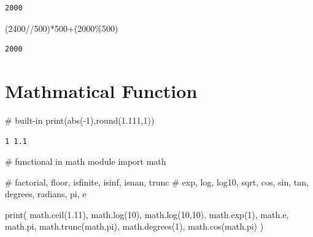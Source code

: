 \documentclass[
  a4paper,
  DIV=11,
  numbers=noendperiod]{scrreprt}
\newenvironment{Shaded}{\begin{snugshade}}{\end{snugshade}}
\newcommand{\BuiltInTok}[1]{\textcolor[rgb]{0.00,0.23,0.31}{#1}}
\newcommand{\CommentTok}[1]{\textcolor[rgb]{0.37,0.37,0.37}{#1}}
\newcommand{\DecValTok}[1]{\textcolor[rgb]{0.68,0.00,0.00}{#1}}
\newcommand{\FloatTok}[1]{\textcolor[rgb]{0.68,0.00,0.00}{#1}}
\newcommand{\ImportTok}[1]{\textcolor[rgb]{0.00,0.46,0.62}{#1}}
\newcommand{\NormalTok}[1]{\textcolor[rgb]{0.00,0.23,0.31}{#1}}
\newcommand{\OperatorTok}[1]{\textcolor[rgb]{0.37,0.37,0.37}{#1}}
\begin{document}
\begin{verbatim}
2000
\end{verbatim}

\begin{Shaded}
\begin{Highlighting}[]
\NormalTok{(}\DecValTok{2400}\OperatorTok{//}\DecValTok{500}\NormalTok{)}\OperatorTok{*}\DecValTok{500}\OperatorTok{+}\NormalTok{(}\DecValTok{2000}\OperatorTok{\%}\DecValTok{500}\NormalTok{)}
\end{Highlighting}
\end{Shaded}

\begin{verbatim}
2000
\end{verbatim}

\section{Mathmatical Function}\label{mathmatical-function}

\begin{Shaded}
\begin{Highlighting}[]
\CommentTok{\# built{-}in}
\BuiltInTok{print}\NormalTok{(}\BuiltInTok{abs}\NormalTok{(}\OperatorTok{{-}}\DecValTok{1}\NormalTok{),}\BuiltInTok{round}\NormalTok{(}\FloatTok{1.111}\NormalTok{,}\DecValTok{1}\NormalTok{))}
\end{Highlighting}
\end{Shaded}

\begin{verbatim}
1 1.1
\end{verbatim}

\begin{Shaded}
\begin{Highlighting}[]
\CommentTok{\# functional in math module}
\ImportTok{import}\NormalTok{ math}

\CommentTok{\# factorial, floor, isfinite, isinf, isnan, trunc}
\CommentTok{\# exp, log, log10, sqrt, cos, sin, tan, degrees, radians, pi, e}

\BuiltInTok{print}\NormalTok{(}
\NormalTok{math.ceil(}\FloatTok{1.11}\NormalTok{),}
\NormalTok{math.log(}\DecValTok{10}\NormalTok{),}
\NormalTok{math.log(}\DecValTok{10}\NormalTok{,}\DecValTok{10}\NormalTok{),}
\NormalTok{math.exp(}\DecValTok{1}\NormalTok{),}
\NormalTok{math.e,}
\NormalTok{math.pi,}
\NormalTok{math.trunc(math.pi),}
\NormalTok{math.degrees(}\DecValTok{1}\NormalTok{),}
\NormalTok{math.cos(math.pi)}
\NormalTok{)}
\end{Highlighting}
\end{Shaded}
\end{document}

